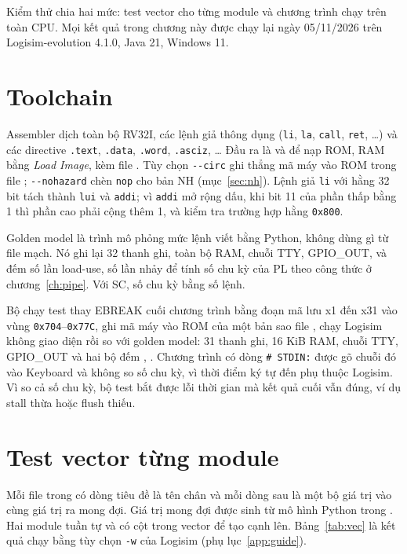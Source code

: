 \documentclass[../report.tex]{subfiles}
\begin{document}
Kiểm thử chia hai mức: test vector cho từng module và chương trình chạy trên toàn CPU. Mọi kết quả trong chương này được chạy lại ngày
05/11/2026 trên Logisim-evolution 4.1.0, Java 21, Windows 11.

\section{Toolchain}

Assembler  dịch toàn bộ RV32I, các lệnh giả thông dụng (\texttt{li}, \texttt{la},
\texttt{call}, \texttt{ret}, \ldots) và các directive \texttt{.text}, \texttt{.data}, \texttt{.word}, \texttt{.asciz},
\ldots{} Đầu ra là  và  để nạp ROM, RAM bằng \emph{Load Image}, kèm file .
Tùy chọn \texttt{-{}-circ} ghi thẳng mã máy vào ROM  trong file ; \texttt{-{}-nohazard} chèn
\texttt{nop} cho bản NH (mục~\ref{sec:nh}). Lệnh giả \texttt{li} với hằng 32 bit tách thành \texttt{lui} và
\texttt{addi}; vì \texttt{addi} mở rộng dấu, khi bit 11 của phần thấp bằng 1 thì phần cao phải cộng thêm 1, và
 kiểm tra trường hợp hằng \texttt{0x800}.

Golden model  là trình mô phỏng mức lệnh viết bằng Python, không dùng gì từ file mạch. Nó ghi
lại 32 thanh ghi, toàn bộ RAM, chuỗi TTY, GPIO\_OUT, và đếm số lần load-use, số lần nhảy để tính số chu kỳ của PL
theo công thức ở chương~\ref{ch:pipe}. Với SC, số chu kỳ bằng số lệnh.

Bộ chạy test  thay EBREAK cuối chương trình bằng đoạn mã lưu x1 đến x31 vào vùng
\texttt{0x704}--\texttt{0x77C}, ghi mã máy vào ROM của một bản sao file , chạy Logisim không giao diện rồi so với
golden model: 31 thanh ghi, 16 KiB RAM, chuỗi TTY, GPIO\_OUT và hai bộ đếm , . Chương trình có dòng
\texttt{\# STDIN:} được gõ chuỗi đó vào Keyboard và không so số chu kỳ, vì thời điểm ký tự đến phụ thuộc Logisim.
Vì so cả số chu kỳ, bộ test bắt được lỗi thời gian mà kết quả cuối vẫn đúng, ví dụ stall thừa hoặc flush thiếu.

\section{Test vector từng module}\label{sec:vec}

Mỗi file trong  có dòng tiêu đề là tên chân và mỗi dòng sau là một bộ giá trị vào cùng giá trị
ra mong đợi. Giá trị mong đợi được sinh từ mô hình Python trong . Hai module tuần tự
 và  có cột  trong vector để tạo cạnh lên. Bảng~\ref{tab:vec} là kết
quả chạy bằng tùy chọn \texttt{-w} của Logisim (phụ lục~\ref{app:guide}).
\end{document}
